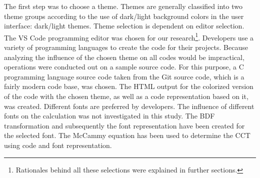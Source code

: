 \documentclass{article}
\begin{document}
The first step was to choose a theme. Themes are generally classified into two theme groups according to the use of dark/light background colors in the user interface: dark/light themes.  Theme selection is dependent on editor selection. The VS Code programming editor was chosen for our research\footnote{Rationales behind all these selections were explained in further sections.}. Developers use a variety of programming languages to create the code for their projects. Because analyzing the influence of the chosen theme on all codes would be impractical, operations were conducted out on a sample source code. For this purpose, a C programming language source code taken from the Git source code, which is a fairly modern code base, was chosen. The HTML output for the colorized version of the code with the chosen theme, as well as a code representation based on it, was created. Different fonts are preferred by developers. The influence of different fonts on the calculation was not investigated in this study. The BDF transformation and subsequently the font representation have been created for the selected font. The McCammy equation has been used to determine the CCT using code and font representation.

\begin{comment}
The flow of transactions taking place in the analysis is presented below, each of which is detailed in the relevant sections. As can be seen in this flowchart, all the coloring themes chosen for a single source code and font sample (bk. \ref{sec:material-methods.inputs})  are kept constant as analysis input is handled separately.
\end{comment}
\end{document}
